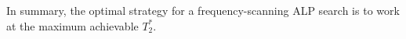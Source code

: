 




In summary, the optimal strategy for a frequency-scanning ALP search is to work at the maximum achievable $T_2^*$.

